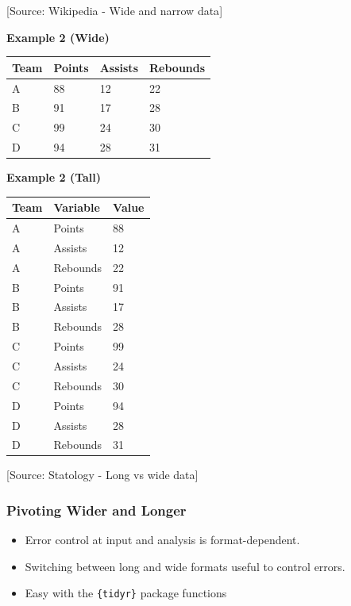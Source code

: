 \documentclass[
  12pt,
]{book}
\begin{document}
{[}Source: Wikipedia - Wide and narrow data{]}

\textbf{Example 2 (Wide)}

\begin{longtable}[]{@{}llll@{}}
\toprule()
Team & Points & Assists & Rebounds \\
\midrule()
\endhead
A & 88 & 12 & 22 \\
B & 91 & 17 & 28 \\
C & 99 & 24 & 30 \\
D & 94 & 28 & 31 \\
\bottomrule()
\end{longtable}

\textbf{Example 2 (Tall)}

\begin{longtable}[]{@{}lll@{}}
\toprule()
Team & Variable & Value \\
\midrule()
\endhead
A & Points & 88 \\
A & Assists & 12 \\
A & Rebounds & 22 \\
B & Points & 91 \\
B & Assists & 17 \\
B & Rebounds & 28 \\
C & Points & 99 \\
C & Assists & 24 \\
C & Rebounds & 30 \\
D & Points & 94 \\
D & Assists & 28 \\
D & Rebounds & 31 \\
\bottomrule()
\end{longtable}

{[}Source: Statology - Long vs wide data{]}

\hypertarget{pivoting-wider-and-longer}{%
\subsubsection{Pivoting Wider and Longer}\label{pivoting-wider-and-longer}}

\begin{itemize}
\item
  Error control at input and analysis is format-dependent.
\item
  Switching between long and wide formats useful to control errors.
\item
  Easy with the \texttt{\{tidyr\}} package functions
\end{itemize}
\end{document}
